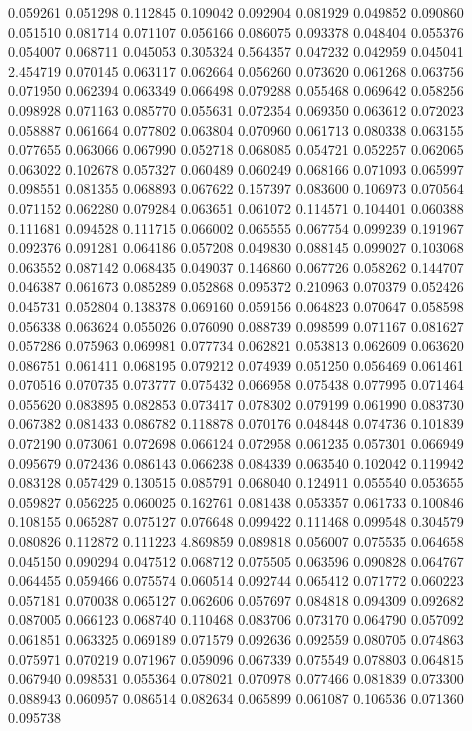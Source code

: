 0.059261
0.051298
0.112845
0.109042
0.092904
0.081929
0.049852
0.090860
0.051510
0.081714
0.071107
0.056166
0.086075
0.093378
0.048404
0.055376
0.054007
0.068711
0.045053
0.305324
0.564357
0.047232
0.042959
0.045041
2.454719
0.070145
0.063117
0.062664
0.056260
0.073620
0.061268
0.063756
0.071950
0.062394
0.063349
0.066498
0.079288
0.055468
0.069642
0.058256
0.098928
0.071163
0.085770
0.055631
0.072354
0.069350
0.063612
0.072023
0.058887
0.061664
0.077802
0.063804
0.070960
0.061713
0.080338
0.063155
0.077655
0.063066
0.067990
0.052718
0.068085
0.054721
0.052257
0.062065
0.063022
0.102678
0.057327
0.060489
0.060249
0.068166
0.071093
0.065997
0.098551
0.081355
0.068893
0.067622
0.157397
0.083600
0.106973
0.070564
0.071152
0.062280
0.079284
0.063651
0.061072
0.114571
0.104401
0.060388
0.111681
0.094528
0.111715
0.066002
0.065555
0.067754
0.099239
0.191967
0.092376
0.091281
0.064186
0.057208
0.049830
0.088145
0.099027
0.103068
0.063552
0.087142
0.068435
0.049037
0.146860
0.067726
0.058262
0.144707
0.046387
0.061673
0.085289
0.052868
0.095372
0.210963
0.070379
0.052426
0.045731
0.052804
0.138378
0.069160
0.059156
0.064823
0.070647
0.058598
0.056338
0.063624
0.055026
0.076090
0.088739
0.098599
0.071167
0.081627
0.057286
0.075963
0.069981
0.077734
0.062821
0.053813
0.062609
0.063620
0.086751
0.061411
0.068195
0.079212
0.074939
0.051250
0.056469
0.061461
0.070516
0.070735
0.073777
0.075432
0.066958
0.075438
0.077995
0.071464
0.055620
0.083895
0.082853
0.073417
0.078302
0.079199
0.061990
0.083730
0.067382
0.081433
0.086782
0.118878
0.070176
0.048448
0.074736
0.101839
0.072190
0.073061
0.072698
0.066124
0.072958
0.061235
0.057301
0.066949
0.095679
0.072436
0.086143
0.066238
0.084339
0.063540
0.102042
0.119942
0.083128
0.057429
0.130515
0.085791
0.068040
0.124911
0.055540
0.053655
0.059827
0.056225
0.060025
0.162761
0.081438
0.053357
0.061733
0.100846
0.108155
0.065287
0.075127
0.076648
0.099422
0.111468
0.099548
0.304579
0.080826
0.112872
0.111223
4.869859
0.089818
0.056007
0.075535
0.064658
0.045150
0.090294
0.047512
0.068712
0.075505
0.063596
0.090828
0.064767
0.064455
0.059466
0.075574
0.060514
0.092744
0.065412
0.071772
0.060223
0.057181
0.070038
0.065127
0.062606
0.057697
0.084818
0.094309
0.092682
0.087005
0.066123
0.068740
0.110468
0.083706
0.073170
0.064790
0.057092
0.061851
0.063325
0.069189
0.071579
0.092636
0.092559
0.080705
0.074863
0.075971
0.070219
0.071967
0.059096
0.067339
0.075549
0.078803
0.064815
0.067940
0.098531
0.055364
0.078021
0.070978
0.077466
0.081839
0.073300
0.088943
0.060957
0.086514
0.082634
0.065899
0.061087
0.106536
0.071360
0.095738
